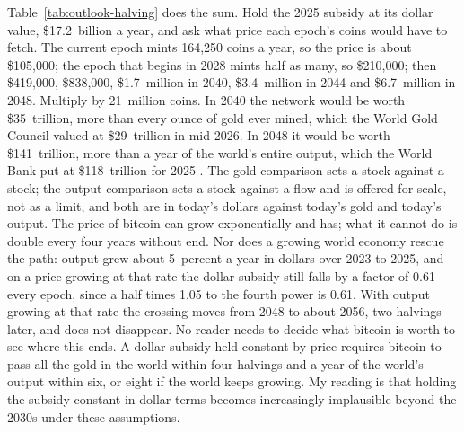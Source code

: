 Table~\ref{tab:outlook-halving} does the sum. Hold the 2025 subsidy at its dollar value, \$17.2~billion a year, and ask what price each epoch's coins would have to fetch. The current epoch mints 164,250 coins a year, so the price is about \$105,000; the epoch that begins in 2028 mints half as many, so \$210,000; then \$419,000, \$838,000, \$1.7~million in 2040, \$3.4~million in 2044 and \$6.7~million in 2048. Multiply by 21~million coins. In 2040 the network would be worth \$35~trillion, more than every ounce of gold ever mined, which the World Gold Council valued at \$29~trillion in mid-2026. In 2048 it would be worth \$141~trillion, more than a year of the world's entire output, which the World Bank put at \$118~trillion for 2025 \autocite{worldbank2025gdp,wgc2026gold}. The gold comparison sets a stock against a stock; the output comparison sets a stock against a flow and is offered for scale, not as a limit, and both are in today's dollars against today's gold and today's output. %
The price of bitcoin can grow exponentially and has; what it cannot do is double every four years without end. Nor does a growing world economy rescue the path: output grew about 5~percent a year in dollars over 2023 to 2025, and on a price growing at that rate the dollar subsidy still falls by a factor of 0.61 every epoch, since a half times 1.05 to the fourth power is 0.61. With output growing at that rate the crossing moves from 2048 to about 2056, two halvings later, and does not disappear. %
No reader needs to decide what bitcoin is worth to see where this ends. A dollar subsidy held constant by price requires bitcoin to pass all the gold in the world within four halvings and a year of the world's output within six, or eight if the world keeps growing. My reading is that holding the subsidy constant in dollar terms becomes increasingly implausible beyond the 2030s under these assumptions.


